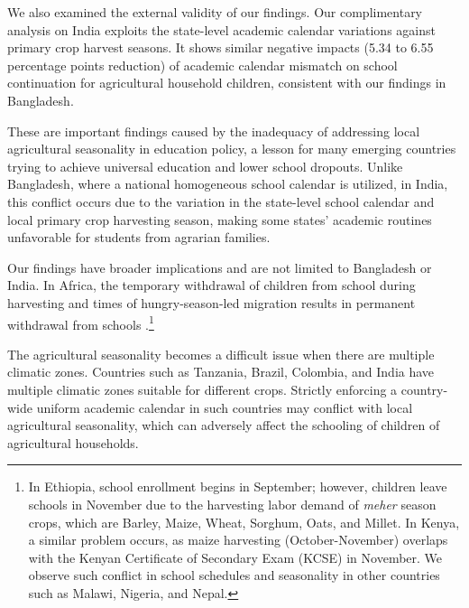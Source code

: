 \documentclass[12pt,letterpaper]{article}
\newcommand{\0}{\ensuremath{\mbox{\boldmath $0$}}}
\begin{document}
We also examined the external validity of our findings. Our complimentary analysis on India exploits the state-level academic calendar variations against primary crop harvest seasons. It shows similar negative impacts (5.34 to 6.55 percentage points reduction) of academic calendar mismatch on school continuation for agricultural household children, consistent with our findings in Bangladesh.

These are important findings caused by the inadequacy of addressing local agricultural seasonality in education policy, a lesson for many emerging countries trying to achieve universal education and lower school dropouts. Unlike Bangladesh, where a national homogeneous school calendar is utilized, in India, this conflict occurs due to the variation in the state-level school calendar and local primary crop harvesting season, making some states' academic routines unfavorable for students from agrarian families. 

Our findings have broader implications and are not limited to Bangladesh or India. In Africa, the temporary withdrawal of children from school during harvesting and times of hungry-season-led migration results in permanent withdrawal from schools \citep{ andvig1999child, Colclough2000, Hadley2010, kadzamira2003can, WorldBank1998}.\footnote{In Ethiopia, school enrollment begins in September; however, children leave schools in November due to the harvesting labor demand of \textit{meher} season crops, which are Barley, Maize, Wheat, Sorghum, Oats, and Millet. In Kenya, a similar problem occurs, as maize harvesting (October-November) overlaps with the Kenyan Certificate of Secondary Exam (KCSE) in November. We observe such conflict in school schedules and seasonality in other countries such as Malawi, Nigeria, and Nepal.} 

The agricultural seasonality becomes a difficult issue when there are multiple climatic zones. Countries such as Tanzania, Brazil, Colombia, and India have multiple climatic zones suitable for different crops. Strictly enforcing a country-wide uniform academic calendar in such countries may conflict with local agricultural seasonality, which can adversely affect the schooling of children of agricultural households. 
\end{document}
